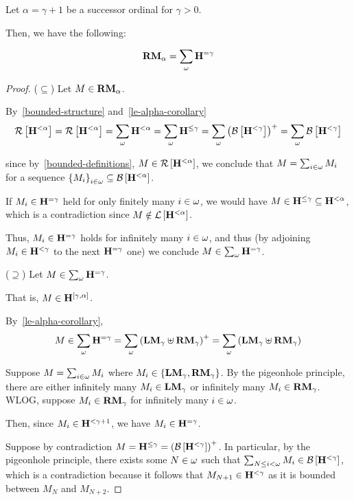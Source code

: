 \begin{lemma}\label{rmj-successor-decomposition}
  Let $\alpha = \gamma + 1$ be a successor ordinal for $\gamma > 0$.

  Then, we have the following:

  \[
    \mathbf{RM}_{\alpha} = \sum_{\omega}{\mathbf{H}_{}^{= \gamma}}
  \]
\end{lemma}

\begin{proof}
  ($\subseteq$) Let $M \in \mathbf{RM}_{\alpha}$.

  By~\cref{bounded-structure} and~\cref{le-alpha-corollary}
  \[
    \mathcal{R} \left[ {\mathbf{H}_{}^{< \alpha}} \right]
    = \mathcal{R} \left[ {\mathbf{H}_{}^{< \alpha}} \right]
    = \sum_{\omega}{\mathbf{H}_{}^{< \alpha}}
    = \sum_{\omega}{\mathbf{H}_{}^{\le \gamma}}
    = \sum_{\omega}{\left( {\mathcal{B} \left[ {\mathbf{H}_{}^{< \gamma}} \right]} \right)^+}
    = \sum_{\omega}{\mathcal{B} \left[ {\mathbf{H}_{}^{< \gamma}} \right]}
  \]

  since by~\cref{bounded-definitions}, $M \in \mathcal{R} \left[ {\mathbf{H}_{}^{< \alpha}} \right]$,
  we conclude that $M = \sum_{i \in \omega}{M_i}$ for a sequence
  $\left\{ {M_i} \right\}_{i \in \omega} \subseteq \mathcal{B} \left[ {\mathbf{H}_{}^{< \alpha}} \right]$.

  If $M_i \in \mathbf{H}_{}^{= \gamma}$ held for only finitely many $i \in \omega$,
  we would have $M \in \mathbf{H}_{}^{\le \gamma} \subseteq \mathbf{H}_{}^{< \alpha}$, which is a contradiction
  since $M \notin \mathcal{L} \left[ {\mathbf{H}_{}^{< \alpha}} \right]$.

  Thus, $M_i \in \mathbf{H}_{}^{= \gamma}$ holds
  for infinitely many $i \in \omega$, and thus (by adjoining $M_i \in \mathbf{H}_{}^{< \gamma}$
  to the next $\mathbf{H}_{}^{= \gamma}$ one) we conclude $M \in \sum_{\omega}{\mathbf{H}_{}^{= \gamma}}$.

  ($\supseteq$) Let $M \in \sum_{\omega}{\mathbf{H}_{}^{= \gamma}}$.

  That is, $M \in \mathbf{H}_{}^{[\gamma, \alpha]}$.

  By~\cref{le-alpha-corollary},
  \[
    M \in \sum_{\omega}{\mathbf{H}_{}^{= \gamma}}
    = \sum_{\omega} \left( { \mathbf{LM}_{\gamma} \uplus \mathbf{RM}_{\gamma} } \right)^+
    = \sum_{\omega} \left( { \mathbf{LM}_{\gamma} \uplus \mathbf{RM}_{\gamma} } \right)
  \]

  Suppose $M = \sum_{i \in \omega}{M_i}$ where $M_i \in \left\{ {\mathbf{LM}_{\gamma}, \mathbf{RM}_{\gamma}} \right\}$.
  By the pigeonhole principle, there are either
  infinitely many $M_i \in \mathbf{LM}_{\gamma}$ or infinitely many $M_i \in \mathbf{RM}_{\gamma}$.
  WLOG, suppose $M_i \in \mathbf{RM}_{\gamma}$ for infinitely many $i \in \omega$.

  Then, since $M_i \in \mathbf{H}_{}^{< \gamma + 1}$, we have $M_i \in \mathbf{H}_{}^{= \gamma}$.

  Suppose by contradiction $M = \mathbf{H}_{}^{\le \gamma} = \left( {\mathcal{B} \left[ {\mathbf{H}_{}^{< \gamma}} \right]} \right)^+$.
  In particular, by the pigeonhole principle, there exists some $N \in \omega$
  such that $\sum_{N \le i < \omega} M_i \in \mathcal{B} \left[ {\mathbf{H}_{}^{< \gamma}} \right]$,
  which is a contradiction because it follows that $M_{N+1} \in \mathbf{H}_{}^{< \gamma}$ as it is bounded
  between $M_N$ and $M_{N+2}$.
\end{proof}

